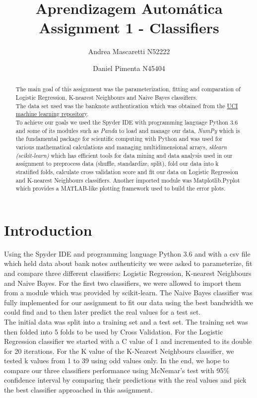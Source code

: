 \documentclass[a4paper]{article}
\title{\textbf{Aprendizagem Autom\'{a}tica} \\
\large Assignment 1 - Classifiers}
\author{Andrea Mascaretti N52222\and Daniel Pimenta N45404}
\begin{document}
\maketitle

\begin{abstract}
The main goal of this assignment was the parameterization, fitting and comparation of Logistic Regression,
 K-nearest Neighbours and Naive Bayes classifiers.\\ 
The data set used was the banknote authentication which was obtained from the
 \href{https://archive.ics.uci.edu/ml/datasets/banknote+authentication}{UCI machine learning repository}.\\
To achieve our goals we used the Spyder IDE with programming language Python 3.6 and some of its modules 
such as \textit{Panda} to load and manage our data, \textit{NumPy} which is the fundamental package for 
scientific computing with Python and was used for various mathematical calculations and managing multidimensional 
arrays, \textit{sklearn (scikit-learn)} which has efficient tools for data mining and data analysis used in our assignment 
to preprocess data (shuffle, standardize, split), fold our data into k stratified folds, calculate cross validation score and 
fit our data on Logistic Regression and K-nearest Neighbours classifiers. Another imported module was Matplotlib.Pyplot
 which provides a MATLAB-like plotting framework used to build the error plots. 
\end{abstract}

\section{Introduction}
Using the Spyder IDE and programming language Python 3.6 and with a csv file which held data about bank notes authenticity 
we were asked to parameterize, fit and compare three different classifiers: Logistic Regression, K-nearest Neighbours and Naive Bayes. 
For the first two classifiers, we were allowed to import them from a module which was provided by scikit-learn. 
The Naive Bayes classifier was fully implemented for our assignment to fit our data using the best bandwidth we could find and to then later predict the real values
for a test set.\\
The initial data was split into a training set and a test set. The training set was then folded into 5 folds to be used by Cross Validation.
For the Logistic Regression classifier we started with a C value of 1 and incremented to its double for 20 iterations.
For the K value of the K-Nearest Neighbours classifier, we tested k values from 1 to 39 using odd values only. 
In the end, we hope to compare our three classifiers performance using McNemar's test with 95\%  confidence interval 
by comparing their predictions with the real values and pick the best classifier approached in this assignment.
\end{document}
